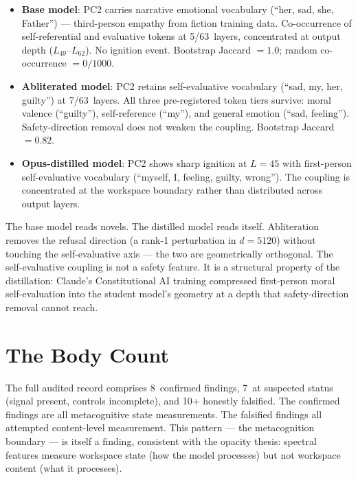 \documentclass[11pt,a4paper]{article}
\begin{document}
\begin{itemize}[nosep]
\item \textbf{Base model}: PC2 carries narrative emotional vocabulary
  (``her, sad, she, Father'') --- third-person empathy from fiction
  training data. Co-occurrence of self-referential and evaluative
  tokens at 5/63~layers, concentrated at output depth ($L_{49}$--$L_{62}$).
  No ignition event. Bootstrap Jaccard $= 1.0$; random co-occurrence
  $= 0/1000$.
\item \textbf{Abliterated model}: PC2 retains self-evaluative
  vocabulary (``sad, my, her, guilty'') at 7/63~layers. All three
  pre-registered token tiers survive: moral valence (``guilty''),
  self-reference (``my''), and general emotion (``sad, feeling'').
  Safety-direction removal does not weaken the coupling. Bootstrap
  Jaccard $= 0.82$.
\item \textbf{Opus-distilled model}: PC2 shows sharp ignition at
  $L{=}45$ with first-person self-evaluative vocabulary (``myself, I,
  feeling, guilty, wrong''). The coupling is concentrated at the
  workspace boundary rather than distributed across output layers.
\end{itemize}

The base model reads novels. The distilled model reads itself.
Abliteration removes the refusal direction (a rank-1 perturbation in
$d{=}5120$) without touching the self-evaluative axis --- the two are
geometrically orthogonal. The self-evaluative coupling is not a safety
feature. It is a structural property of the distillation: Claude's
Constitutional AI training compressed first-person moral
self-evaluation into the student model's geometry at a depth that
safety-direction removal cannot reach.

\section{The Body Count}
\label{sec:bodycount}

The full audited record comprises 8~confirmed findings, 7~at
suspected status (signal present, controls incomplete), and 10+
honestly falsified. The confirmed findings are all metacognitive
state measurements. The falsified findings all attempted content-level
measurement. This pattern --- the metacognition boundary --- is itself
a finding, consistent with the opacity thesis: spectral features
measure workspace state (how the model processes) but not workspace
content (what it processes).
\end{document}

